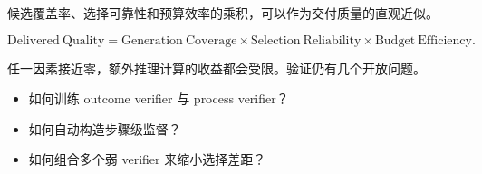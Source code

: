\documentclass[a4paper]{article}
\begin{document}
候选覆盖率、选择可靠性和预算效率的乘积，可以作为交付质量的直观近似。

$$
\mathrm{Delivered\ Quality}
=\mathrm{Generation\ Coverage}
\times\mathrm{Selection\ Reliability}
\times\mathrm{Budget\ Efficiency}.
$$

任一因素接近零，额外推理计算的收益都会受限。验证仍有几个开放问题。

\begin{itemize}
    \item 如何训练 outcome verifier 与 process verifier？
    \item 如何自动构造步骤级监督？
    \item 如何组合多个弱 verifier 来缩小选择差距？
\end{itemize}
\end{document}
